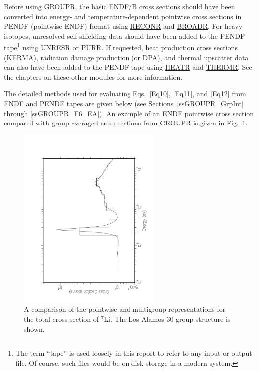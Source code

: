Before using GROUPR, the basic ENDF/B cross sections should have been
converted into energy- and temperature-dependent pointwise cross sections
in PENDF (pointwise ENDF) format using
\hyperlink{sRECONRhy}{RECONR} and
\hyperlink{sBROADRhy}{BROADR}.  For heavy
isotopes, unresolved self-shielding
data should have been added to the PENDF tape\footnote{
  The term ``tape'' is used loosely in this report to refer
  to any input or output file.  Of course, such files would
  be on disk storage in a modern system.}
using \hyperlink{sUNRESRhy}{UNRESR} or
\hyperlink{sPURRhy}{PURR}.  If requested, heat production
cross sections (KERMA), radiation damage production
(or DPA), and thermal upscatter data can also have been
added to the PENDF tape using \hyperlink{sHEATRhy}{HEATR}
and \hyperlink{sTHERMRhy}{THERMR}.
See the chapters on these other modules for more information.

The detailed methods used for evaluating Eqs.~\ref{Eq10}, \ref{Eq11},
and \ref{Eq12} from ENDF and PENDF tapes are given below (see
Sections~\ref{ssGROUPR_GrpInt} through \ref{ssGROUPR_F6_EA}).  An
 example of an ENDF pointwise cross section compared with group-averaged
 cross sections from GROUPR is given in Fig.~\ref{gr1}.

\begin{figure}[thb]\centering
\includegraphics[keepaspectratio, height=3.5in, angle=270]{figs/groupr1ack}
\caption[Pointwise and multigroup cross section comparison]{A comparison
 of the pointwise and multigroup representations for the total cross section of
 $^{7}$Li.  The Los Alamos 30-group structure is shown.}
\label{gr1}
\end{figure}

